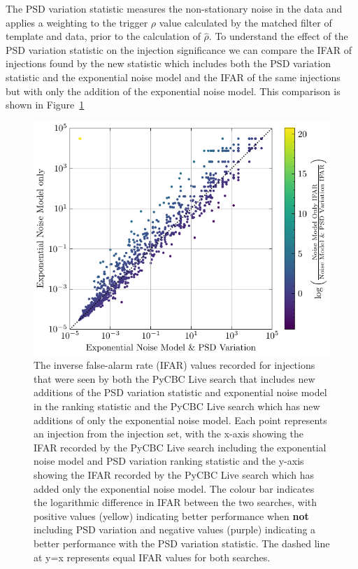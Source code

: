 The PSD variation statistic measures the non-stationary noise in the data and applies a weighting to the trigger $\rho$ value calculated by the matched filter of template and data, prior to the calculation of $\hat{\rho}$. To understand the effect of the PSD variation statistic on the injection significance we can compare the IFAR of injections found by the new statistic which includes both the PSD variation statistic and the exponential noise model and the IFAR of the same injections but with only the addition of the exponential noise model. This comparison is shown in Figure~\ref{5:fig:ifar-ifar-fits-vs-fits-psdvar}
%
\begin{figure}
       \centering
    \includegraphics[width=1\textwidth]{images/5_pycbclive/plots/fits_only_fits_psd_var_ifar_vs_ifar.pdf}
    \caption{The inverse false-alarm rate (IFAR) values recorded for injections that were seen by both the PyCBC Live search that includes new additions of the PSD variation statistic and exponential noise model in the ranking statistic and the PyCBC Live search which has new additions of only the exponential noise model. Each point represents an injection from the injection set, with the x-axis showing the IFAR recorded by the PyCBC Live search including the exponential noise model and PSD variation ranking statistic and the y-axis showing the IFAR recorded by the PyCBC Live search which has added only the exponential noise model. The colour bar indicates the logarithmic difference in IFAR between the two searches, with positive values (yellow) indicating better performance when \textbf{not} including PSD variation and negative values (purple) indicating a better performance with the PSD variation statistic. The dashed line at y=x represents equal IFAR values for both searches.}
    \label{5:fig:ifar-ifar-fits-vs-fits-psdvar}
\end{figure}
